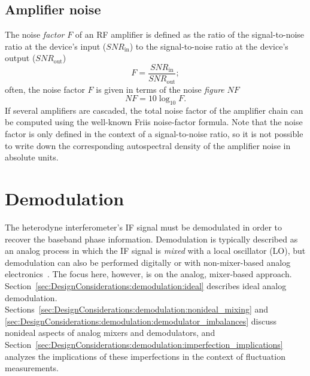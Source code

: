 \subsection{Amplifier noise}
The noise \emph{factor} $F$ of an RF amplifier is defined as the ratio of
the signal-to-noise ratio at the device's input ($SNR_{\text{in}}$) to
the signal-to-noise ratio at the device's output ($SNR_{\text{out}}$)
\begin{equation}
  F = \frac{SNR_{\text{in}}}{SNR_{\text{out}}};
\end{equation}
often, the noise factor $F$ is given
in terms of the noise \emph{figure} $NF$
\cite{minicircuits_amplifier_terms_defined}
\begin{equation}
  NF = 10 \log_{10} F.
\end{equation}
If several amplifiers are cascaded,
the total noise factor of the amplifier chain
can be computed using the well-known Friis noise-factor formula.
Note that the noise factor is only defined
in the context of a signal-to-noise ratio, so
it is not possible to write down the corresponding
autospectral density of the amplifier noise in absolute units.


\section{Demodulation}
\label{sec:DesignConsiderations:demodulation}
The heterodyne interferometer's IF signal must be demodulated
in order to recover the baseband phase information.
Demodulation is typically described as an analog process
in which the IF signal is \emph{mixed} with a local oscillator (LO), but
demodulation can also be performed digitally
\cite{vanzeeland_rsi08, mlynek_fst12} or
with non-mixer-based analog electronics~\cite{mlynek_rsi17}.
The focus here, however, is on the analog, mixer-based approach.
Section~\ref{sec:DesignConsiderations:demodulation:ideal}
describes ideal analog demodulation.
Sections~\ref{sec:DesignConsiderations:demodulation:nonideal_mixing} and
\ref{sec:DesignConsiderations:demodulation:demodulator_imbalances}
discuss nonideal aspects of analog mixers and demodulators, and
Section~\ref{sec:DesignConsiderations:demodulation:imperfection_implications}
analyzes the implications of these imperfections
in the context of fluctuation measurements.


